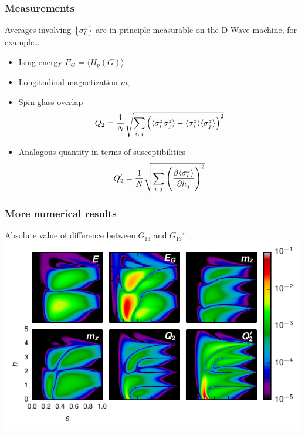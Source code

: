 \documentclass{beamer}
\newcommand{\ev}[1]{\langle #1 \rangle} %
\begin{document}
\appendix
\section{\appendixname}

\begin{frame}
  \frametitle{Measurements}
  Averages involving $\set{\sigma^z_i}$ are in principle measurable on the
  D-Wave machine, for example\ldots
  \begin{itemize}
    \item Ising energy $E_G=\ev{H_p(G)}$
    \item Longitudinal magnetization $m_z$
    \item Spin glass overlap
    \begin{equation*}
      Q_2 = \frac{1}{N} \sqrt{
        \sum_{i,\,j} \del{
          \ev{\sigma^z_i \sigma^z_j} -
          \ev{\sigma^z_i} \ev{\sigma^z_j}
        }^2
      }
    \end{equation*}
    \item Analagous quantity in terms of susceptibilities
    \begin{equation*}
      Q_2' = \frac{1}{N} \sqrt{\sum_{i,\,j} \del{\dpd{\ev{\sigma^z_i}}{h_j}}^2}
    \end{equation*}
  \end{itemize}
\end{frame}

\begin{frame}
  \frametitle{More numerical results}
  \begin{center}
    Absolute value of difference between $G_{13}$ and $G_{13}'$
    \includegraphics{delta-grid}
  \end{center}
\end{frame}
\end{document}
